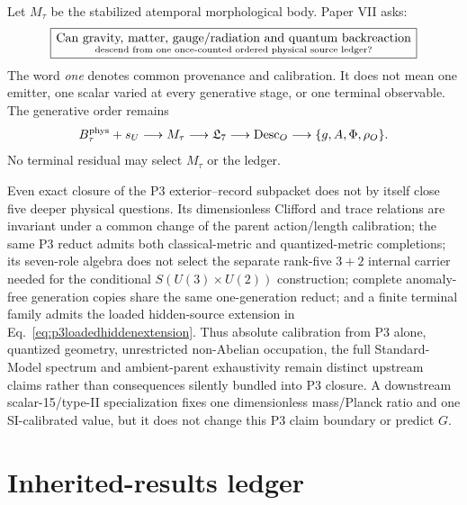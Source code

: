\documentclass[11pt]{article}
\begin{document}
Let $M_\tau$ be the stabilized atemporal morphological body. Paper VII asks:
\begin{equation}
\boxed{\text{Can gravity, matter, gauge/radiation and quantum backreaction}
\atop\text{descend from one once-counted ordered physical source ledger?}}
\end{equation}
The word \emph{one} denotes common provenance and calibration. It does not
mean one emitter, one scalar varied at every generative stage, or one terminal
observable. The generative order remains
\begin{equation}
B_\tau^{\rm phys}+s_U\longrightarrow M_\tau
\longrightarrow \mathfrak L_7
\longrightarrow \operatorname{Desc}_O
\longrightarrow \{g,A,\Phi,\rho_O\}.
\end{equation}
No terminal residual may select $M_\tau$ or the ledger.

Even exact closure of the P3 exterior--record subpacket does not by itself
close five deeper physical questions.  Its dimensionless Clifford and trace
relations are invariant under a common change of the parent action/length
calibration; the same P3 reduct admits both classical-metric and
quantized-metric completions; its seven-role algebra does not select the
separate rank-five $3+2$ internal carrier needed for the conditional
$S(U(3)\times U(2))$ construction; complete anomaly-free generation copies
share the same one-generation reduct; and a finite terminal family admits the
loaded hidden-source extension in Eq.~\eqref{eq:p3loadedhiddenextension}.
Thus absolute calibration from P3 alone, quantized geometry, unrestricted
non-Abelian occupation, the full Standard-Model spectrum and ambient-parent
exhaustivity remain distinct upstream claims rather than consequences silently
bundled into P3 closure.  A downstream scalar-15/type-II specialization fixes
one dimensionless mass/Planck ratio and one SI-calibrated value, but it does
not change this P3 claim boundary or predict \(G\).

\section{Inherited-results ledger}
\end{document}
